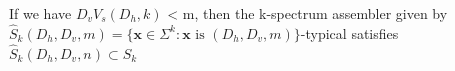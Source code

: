 \documentclass[preview]{standalone}
\begin{document}
\begin{center}
If we have ${D}_v{V}_s({D}_h, k)$ < m, then the k-spectrum assembler given by $\hat{S}_k({D}_h, {D}_v, m) = \{\textbf{x} \in \Sigma^k: \textbf{x} \text{ is }({D}_h, {D}_v, m)\}$-typical satisfies $\hat{S}_k({D}_h, {D}_v, n) \subset {S}_k$
\end{center}
\end{document}
